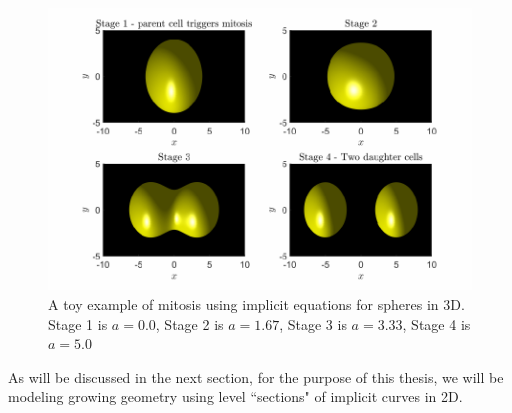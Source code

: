 \begin{figure}[h]
\centering
\includegraphics[width=1\textwidth]{chapter1/figures/CellDivisionDemo.pdf}
\caption{A toy example of mitosis using implicit equations for spheres in 3D. Stage 1 is $a= 0.0$, Stage 2 is $a= 1.67$, Stage 3 is $a=3.33$, Stage 4 is $a = 5.0$}
\label{fig:ToyMitosis}
\end{figure}
\filbreak

As will be discussed in the next section, for the purpose of this thesis, we will be modeling growing geometry using level ``sections" of implicit curves in 2D.

